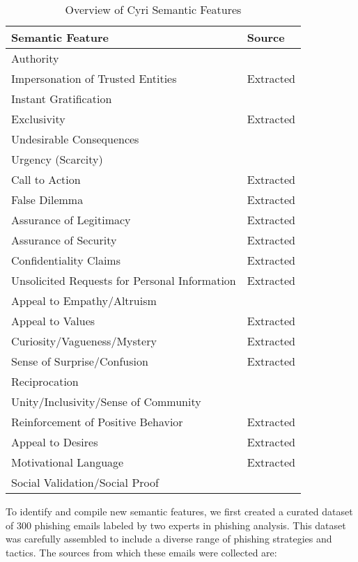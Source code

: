 \begin{table}[ht]
\centering %
\caption{Overview of Cyri Semantic Features} %
\label{tab:semantic-features} %
\begin{tabular}{p{5.5cm}p{1.5cm}} %
\toprule %
\textbf{Semantic Feature} & \textbf{Source} \\ %
\midrule %
Authority &  \cite{b8, b20}\\
Impersonation of Trusted Entities &  Extracted\\ 
Instant Gratification &  \cite{b10}\\
Exclusivity &  Extracted \\
Undesirable Consequences & \cite{b10}\\ 
Urgency (Scarcity) &  \cite{b20, b37}\\
Call to Action &  Extracted\\
False Dilemma &  Extracted\\
Assurance of Legitimacy & Extracted \\
Assurance of Security &  Extracted\\
Confidentiality Claims &  Extracted\\
Unsolicited Requests for Personal Information & Extracted \\
Appeal to Empathy/Altruism & \cite{b10} \\
Appeal to Values &  Extracted\\
Curiosity/Vagueness/Mystery & Extracted \\
Sense of Surprise/Confusion & Extracted \\
Reciprocation &  \cite{b20, b37}\\
Unity/Inclusivity/Sense of Community & \cite{b20} \\
Reinforcement of Positive Behavior &  Extracted\\
Appeal to Desires & Extracted \\
Motivational Language &  Extracted\\
Social Validation/Social Proof &  \cite{b20, b37} \\
\bottomrule %
\end{tabular}
\end{table}

To identify and compile new semantic features, we first created a curated dataset of 300 phishing emails labeled by two experts in phishing analysis. This dataset was carefully assembled to include a
diverse range of phishing strategies and tactics. The sources from which  these emails were collected are:

